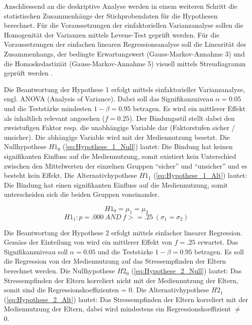 Anschliessend an die deskriptive Analyse werden in einem weiteren Schritt die statistischen Zusammenhänge der Stichprobendaten für die Hypothesen berechnet. Für die Voraussetzungen der einfaktoriellen Varianzanalyse sollen die Homogenität der Varianzen mittels Levene-Test geprüft werden. Für die Voraussetzungen der einfachen linearen Regressionsanalyse soll die Linearität des Zusammenhangs, der bedingte Erwartungswert (Gauss-Markov-Annahme 3) und die Homoskedastiziät (Gauss-Markov-Annahme 5) visuell mittels Streudiagramm geprüft werden \cite{UniversitatZurich2018}.

Die Beantwortung der Hypothese 1 erfolgt mittels einfaktorieller Varianzanalyse, engl. ANOVA (Analysis of Variance). Dabei soll das Signifikanzniveau $\alpha = 0.05$ und die Teststärke mindesten $1-\beta = 0.95$ betragen. Es wird ein mittlerer Effekt \cite{Cohen1988a} als inhaltlich relevant angesehen ($f = 0.25$). Der Bindungsstil stellt dabei den zweistufigen Faktor resp. die unabhängige Variable dar (Faktorstufen sicher / unsicher). Die abhängige Variable wird mit der Mediennutzung besetzt. Die Nullhypothese $H1_{0}$ (\ref{eq:Hypothese_1_Null}) lautet: Die Bindung hat keinen signifikanten Einfluss auf die Mediennutzung, somit existiert kein Unterschied zwischen den Mittelwerten der einzelnen Gruppen \enquote{sicher} und \enquote{unsicher} und es besteht kein Effekt. Die Alternativhypothese $H1_{1}$ (\ref{eq:Hypothese_1_Alt})  lautet: Die Bindung hat einen signifikanten Einfluss auf die Mediennutzung, somit unterscheiden sich die beiden Gruppen voneinander.

\begin{equation}\label{eq:Hypothese_1_Null}
    H1_{0} = \mu_1 = \mu_2
\end{equation}
\begin{equation}\label{eq:Hypothese_1_Alt}
    H1_{1}:p = .000 ~ AND ~ f >= .25~ (\sigma_1 = \sigma_2)
\end{equation}

Die Beantwortung der Hypothese 2 erfolgt mittels einfacher linearer Regression. Gemäss der Einteilung von  wird ein mittlerer Effekt von $f = .25$ erwartet. Das Signifikanzniveau soll $\alpha = 0.05$ und die Teststärke $1-\beta = 0.95$ betragen. Es soll die Regression von der Mediennutzung auf das Stressempfinden der Eltern berechnet werden. Die Nullhypothese $H2_{0}$ (\ref{eq:Hypothese_2_Null}) lautet: Das Stressempfinden der Eltern korreliert nicht  mit der Mediennutzung der Eltern, somit sind die Regressionskoeffizienten = 0. Die Alternativhypothese $H2_{1}$ (\ref{eq:Hypothese_2_Alt}) lautet: Das Stressempfinden der Eltern korreliert mit der Mediennutzung der Eltern, dabei wird mindestens ein Regressionskoeffizient $\neq$ 0.

